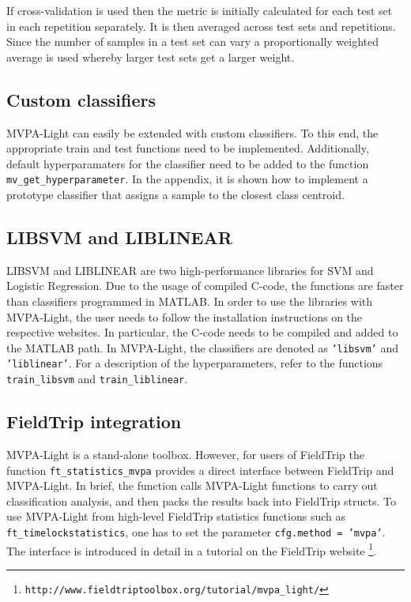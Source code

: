 \documentclass[utf8]{frontiersSCNS} %
\newcommand{\ttt}[1]{\texttt{#1}}
\begin{document}
If cross-validation is used then the metric is initially calculated for each test set in each repetition separately. It is then averaged across test sets and repetitions. Since the number of samples in a test set can vary a proportionally weighted average is used whereby larger test sets get a larger weight.

\subsection{Custom classifiers}

MVPA-Light can easily be extended with custom classifiers. To this end, the appropriate train and test functions need to be implemented. Additionally, default hyperparamaters for the classifier need to be added to the function \ttt{mv\_get\_hyperparameter}. In the appendix, it is shown how to implement a prototype classifier that assigns a sample to the closest class centroid.

\subsection{LIBSVM and LIBLINEAR}

LIBSVM \cite{Chang2011LIBSVM:Machines} and LIBLINEAR \cite{Fan2008} are two high-performance libraries for SVM and Logistic Regression. Due to the usage of compiled C-code, the functions are faster than classifiers programmed in MATLAB. In order to use the libraries with MVPA-Light, the user needs to follow the installation instructions on the respective websites. In particular, the C-code needs to be compiled and added to the MATLAB path. In MVPA-Light, the classifiers are denoted as \ttt{'libsvm'} and \ttt{'liblinear'}. For a description of the hyperparameters, refer to the functions  \ttt{train\_libsvm} and \ttt{train\_liblinear}.

\subsection{FieldTrip integration}

MVPA-Light is a stand-alone toolbox. However, for users of FieldTrip \citep{Oostenveld2011} the function  \ttt{ft\_statistics\_mvpa} provides a direct interface between FieldTrip and MVPA-Light. In brief, the function calls MVPA-Light functions to carry out classification analysis, and then packs the results back into FieldTrip structs. To use MVPA-Light from high-level FieldTrip statistics functions such as \ttt{ft\_timelockstatistics}, one has to set the parameter \ttt{cfg.method = 'mvpa'}. The interface is introduced in detail in a tutorial on the FieldTrip website \footnote{\ttt{http://www.fieldtriptoolbox.org/tutorial/mvpa\_light/}}.
\end{document}
